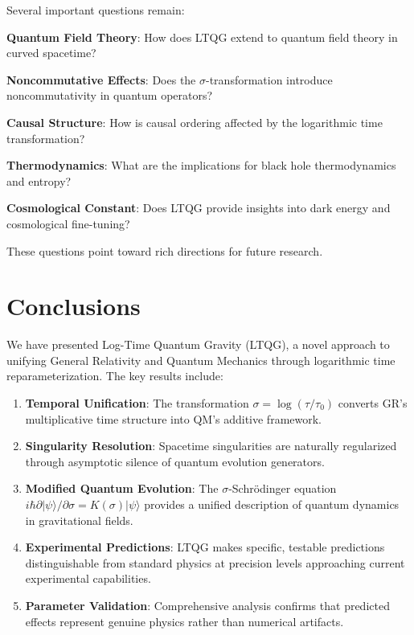 \documentclass[12pt,a4paper]{article}
\begin{document}
Several important questions remain:

\textbf{Quantum Field Theory}: How does LTQG extend to quantum field theory in curved spacetime?

\textbf{Noncommutative Effects}: Does the $\sigma$-transformation introduce noncommutativity in quantum operators?

\textbf{Causal Structure}: How is causal ordering affected by the logarithmic time transformation?

\textbf{Thermodynamics}: What are the implications for black hole thermodynamics and entropy?

\textbf{Cosmological Constant}: Does LTQG provide insights into dark energy and cosmological fine-tuning?

These questions point toward rich directions for future research.

\section{Conclusions}

We have presented Log-Time Quantum Gravity (LTQG), a novel approach to unifying General Relativity and Quantum Mechanics through logarithmic time reparameterization. The key results include:

\begin{enumerate}
\item \textbf{Temporal Unification}: The transformation $\sigma = \log(\tau/\tau_0)$ converts GR's multiplicative time structure into QM's additive framework.

\item \textbf{Singularity Resolution}: Spacetime singularities are naturally regularized through asymptotic silence of quantum evolution generators.

\item \textbf{Modified Quantum Evolution}: The $\sigma$-Schrödinger equation $i\hbar \partial|\psi\rangle/\partial\sigma = K(\sigma)|\psi\rangle$ provides a unified description of quantum dynamics in gravitational fields.

\item \textbf{Experimental Predictions}: LTQG makes specific, testable predictions distinguishable from standard physics at precision levels approaching current experimental capabilities.

\item \textbf{Parameter Validation}: Comprehensive analysis confirms that predicted effects represent genuine physics rather than numerical artifacts.
\end{enumerate}
\end{document}
